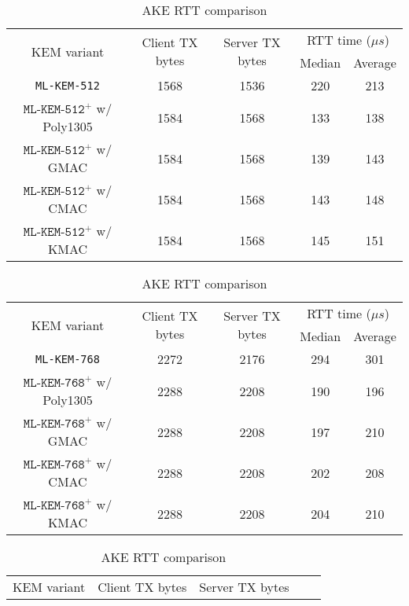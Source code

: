 \documentclass[journal=tches,submission]{iacrtrans}
\newcommand{\us}{\mu s}
\begin{document}
\begin{table}[H]
    \centering
    \small
    \caption{AKE RTT comparison}\label{tbl:ake-rtt}
    \begin{tabular}{|c|c|c|c|c|}
        \hline
        \multirow{2}{*}{KEM variant}
        & \multirow{2}{*}{Client TX bytes}
        & \multirow{2}{*}{Server TX bytes}
        & \multicolumn{2}{|c|}{RTT time ($\us$)} \\
        \cline{4-5}
        & & & Median & Average \\
        \hline
        \texttt{ML-KEM-512} & 1568 & 1536 & 220 & 213 \\
        \hline
        $\texttt{ML-KEM-512}^+$ w/ Poly1305 & 1584 & 1568 & 133 & 138 \\
        \hline
        $\texttt{ML-KEM-512}^+$ w/ GMAC & 1584 & 1568 & 139 & 143 \\
        \hline
        $\texttt{ML-KEM-512}^+$ w/ CMAC & 1584 & 1568 & 143 & 148 \\
        \hline
        $\texttt{ML-KEM-512}^+$ w/ KMAC & 1584 & 1568 & 145 & 151 \\
        \hline
    \end{tabular}\vspace{0.3cm}
    \begin{tabular}{|c|c|c|c|c|}
        \hline
        \multirow{2}{*}{KEM variant}
        & \multirow{2}{*}{Client TX bytes}
        & \multirow{2}{*}{Server TX bytes}
        & \multicolumn{2}{|c|}{RTT time ($\us$)} \\
        \cline{4-5}
        & & & Median & Average \\
        \hline
        \texttt{ML-KEM-768} & 2272 & 2176 & 294 & 301 \\
        \hline
        $\texttt{ML-KEM-768}^+$ w/ Poly1305 & 2288 & 2208 & 190 & 196 \\
        \hline
        $\texttt{ML-KEM-768}^+$ w/ GMAC & 2288 & 2208 & 197 & 210 \\
        \hline
        $\texttt{ML-KEM-768}^+$ w/ CMAC & 2288 & 2208 & 202 & 208 \\
        \hline
        $\texttt{ML-KEM-768}^+$ w/ KMAC & 2288 & 2208 & 204 & 210 \\
        \hline
    \end{tabular}\vspace{0.3cm}
    \begin{tabular}{|c|c|c|c|c|}
        \hline
        \multirow{2}{*}{KEM variant}
        & \multirow{2}{*}{Client TX bytes}
        & \multirow{2}{*}{Server TX bytes}

\end{tabular}
\end{table}
\end{document}
